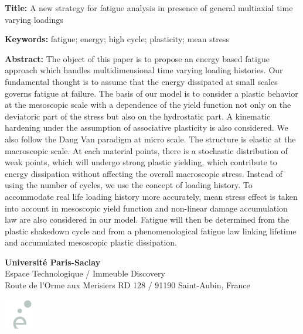 \begin{flushleft}
\vspace{20pt}

\begin{mdframed}
\textbf{Title:} A new strategy for fatigue analysis in presence of general multiaxial time varying loadings

\textbf{Keywords:} fatigue; energy; high cycle; plasticity; mean stress

\textbf{Abstract:} The object of this paper is to propose an energy based fatigue approach which handles multidimensional time varying loading histories. Our fundamental thought is to assume that the energy dissipated at small scales governs fatigue at failure. The basis of our model is to consider a plastic behavior at the mesoscopic scale with a dependence of the yield function not only on the deviatoric part of the stress but also on the hydrostatic part. A kinematic hardening under the assumption of associative plasticity is also considered. We also follow the Dang Van paradigm at micro scale. The structure is elastic at the macroscopic scale. At each material points, there is a stochastic distribution of weak points, which will undergo strong plastic yielding, which contribute to energy dissipation without affecting the overall macroscopic stress. Instead of using the number of cycles, we use the concept of loading history. To accommodate real life loading history more accurately, mean stress effect is taken into account in mesoscopic yield function and non-linear damage accumulation law are also considered in our model. Fatigue will then be determined from the plastic shakedown cycle and from a phenomenological fatigue law linking lifetime and accumulated mesoscopic plastic dissipation.


\end{mdframed}
\end{flushleft}

\vfill

\begin{minipage}[b]{0.5\textwidth}
\small
\color{color02}
\textbf{Université Paris-Saclay} \\
Espace Technologique / Immeuble Discovery  \\
Route de l'Orme aux Merisiers RD 128 / 91190 Saint-Aubin, France
\end{minipage}
\hfill
\begin{minipage}[b]{0.35\textwidth}
\hfill
\includegraphics[width=35pt]{figures/SMEMAG2.png}
\end{minipage}